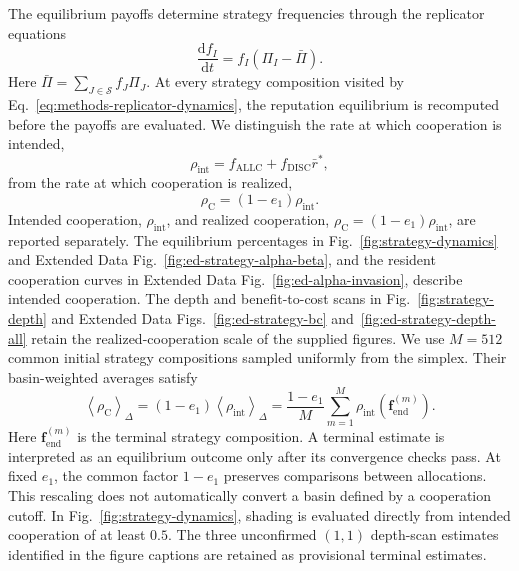\documentclass[fleqn,10pt]{wlscirep}
\begin{document}
The equilibrium payoffs determine strategy frequencies through the replicator equations
\begin{equation}
\frac{\mathrm df_I}{\mathrm dt}
=f_I(\Pi_I-\bar\Pi).
\label{eq:methods-replicator-dynamics}
\end{equation}
Here $\bar\Pi=\sum_{J\in\mathcal S}f_J\Pi_J$. At every strategy composition visited by Eq.~\eqref{eq:methods-replicator-dynamics}, the reputation equilibrium is recomputed before the payoffs are evaluated. We distinguish the rate at which cooperation is intended,
\begin{equation}
\rho_{\mathrm{int}}
=f_{\mathrm{ALLC}}+f_{\mathrm{DISC}}\bar r^*,
\label{eq:methods-intended-cooperation-rate}
\end{equation}
from the rate at which cooperation is realized,
\begin{equation}
\rho_{\mathrm{C}}
=(1-e_1)\rho_{\mathrm{int}}.
\label{eq:methods-cooperation-rate}
\end{equation}
Intended cooperation, $\rho_{\mathrm{int}}$, and realized cooperation, $\rho_{\mathrm C}=(1-e_1)\rho_{\mathrm{int}}$, are reported separately. The equilibrium percentages in Fig.~\ref{fig:strategy-dynamics} and Extended Data Fig.~\ref{fig:ed-strategy-alpha-beta}, and the resident cooperation curves in Extended Data Fig.~\ref{fig:ed-alpha-invasion}, describe intended cooperation. The depth and benefit-to-cost scans in Fig.~\ref{fig:strategy-depth} and Extended Data Figs.~\ref{fig:ed-strategy-bc} and~\ref{fig:ed-strategy-depth-all} retain the realized-cooperation scale of the supplied figures. We use $M=512$ common initial strategy compositions sampled uniformly from the simplex. Their basin-weighted averages satisfy
\begin{equation}
\left\langle\rho_{\mathrm C}\right\rangle_{\Delta}
=(1-e_1)\left\langle\rho_{\mathrm{int}}\right\rangle_{\Delta}
=\frac{1-e_1}{M}\sum_{m=1}^{M}\rho_{\mathrm{int}}\!\left(\boldsymbol f_{\mathrm{end}}^{(m)}\right).
\label{eq:methods-basin-weighted-cooperation}
\end{equation}
Here $\boldsymbol f_{\mathrm{end}}^{(m)}$ is the terminal strategy composition. A terminal estimate is interpreted as an equilibrium outcome only after its convergence checks pass. At fixed $e_1$, the common factor $1-e_1$ preserves comparisons between allocations. This rescaling does not automatically convert a basin defined by a cooperation cutoff. In Fig.~\ref{fig:strategy-dynamics}, shading is evaluated directly from intended cooperation of at least $0.5$. The three unconfirmed $(1,1)$ depth-scan estimates identified in the figure captions are retained as provisional terminal estimates.
\end{document}
